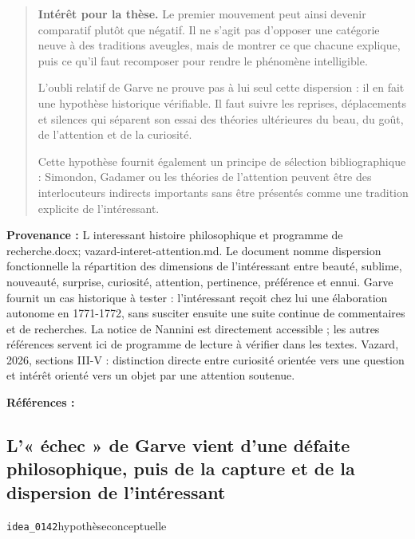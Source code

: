 \documentclass[10pt,a4paper]{article}
\begin{document}
\begin{quote}
\textbf{Intérêt pour la thèse.} Le premier mouvement peut ainsi devenir comparatif plutôt que négatif. Il ne s'agit pas d'opposer une catégorie neuve à des traditions aveugles, mais de montrer ce que chacune explique, puis ce qu'il faut recomposer pour rendre le phénomène intelligible.

L'oubli relatif de Garve ne prouve pas à lui seul cette dispersion : il en fait une hypothèse historique vérifiable. Il faut suivre les reprises, déplacements et silences qui séparent son essai des théories ultérieures du beau, du goût, de l'attention et de la curiosité.

Cette hypothèse fournit également un principe de sélection bibliographique : Simondon, Gadamer ou les théories de l'attention peuvent être des interlocuteurs indirects importants sans être présentés comme une tradition explicite de l'intéressant.
\end{quote}
{\footnotesize\color{metadata}\textbf{Provenance :} L interessant histoire philosophique et programme de recherche.docx; vazard-interet-attention.md. Le document nomme dispersion fonctionnelle la répartition des dimensions de l'intéressant entre beauté, sublime, nouveauté, surprise, curiosité, attention, pertinence, préférence et ennui. Garve fournit un cas historique à tester : l'intéressant reçoit chez lui une élaboration autonome en 1771-1772, sans susciter ensuite une suite continue de commentaires et de recherches. La notice de Nannini est directement accessible ; les autres références servent ici de programme de lecture à vérifier dans les textes. Vazard, 2026, sections III-V : distinction directe entre curiosité orientée vers une question et intérêt orienté vers un objet par une attention soutenue.\par}
{\footnotesize\color{metadata}\textbf{Références :} \parencite{garve1779interessirende,nannini2018garve,bachmannmedick2008anziehungskraft,kolnai1964concept,ngai2008merely,ngai2012categories,nannini2018interesting,goodman1976languages,vazard2026inquiry}\par}

\subsection{L'« échec » de Garve vient d'une défaite philosophique, puis de la capture et de la dispersion de l'intéressant}
{\small\color{metadata} \texttt{idea\_0142}\quad\textbullet\quad hypothèse\quad\textbullet\quad conceptuelle\par}
\end{document}
